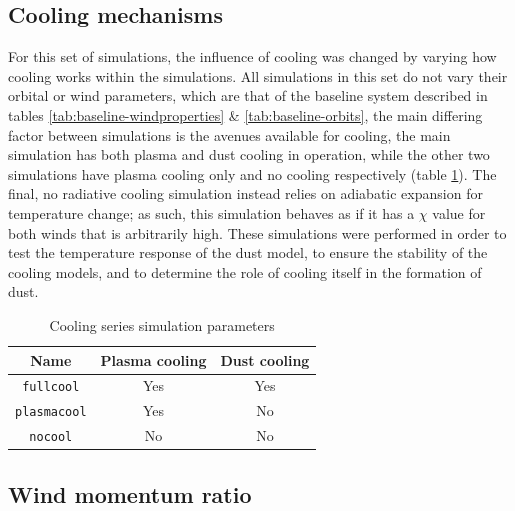 \subsection{Cooling mechanisms}

For this set of simulations, the influence of cooling was changed by varying how cooling works within the simulations.
All simulations in this set do not vary their orbital or wind parameters, which are that of the baseline system described in tables \ref{tab:baseline-windproperties} \& \ref{tab:baseline-orbits}, the main differing factor between simulations is the avenues available for cooling, the main simulation has both plasma and dust cooling in operation, while the other two simulations have plasma cooling only and no cooling respectively (table \ref{tab:cooling-param}).
The final, no radiative cooling simulation instead relies on adiabatic expansion for temperature change; as such, this simulation behaves as if it has a $\chi$ value for both winds that is arbitrarily high.
These simulations were performed in order to test the temperature response of the dust model, to ensure the stability of the cooling models, and to determine the role of cooling itself in the formation of dust.


\begin{table}[h]
  \centering
  \begin{tabular}{ccc}
    \hline
    Name & Plasma cooling & Dust cooling \\
    \hline
    \texttt{fullcool} & Yes & Yes \\ 
    \texttt{plasmacool} & Yes & No \\
    \texttt{nocool} & No & No \\
    \hline
  \end{tabular}
  \caption{Cooling series simulation parameters}
  \label{tab:cooling-param}
\end{table}

\subsection{Wind momentum ratio}


